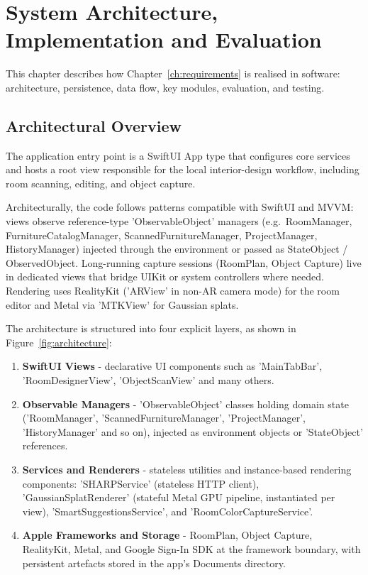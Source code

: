 \chapter{System Architecture, Implementation and Evaluation}
\label{ch:implementation}

This chapter describes how Chapter~\ref{ch:requirements} is realised in software: architecture, persistence, data flow, key modules, evaluation, and testing.

\section{Architectural Overview}

The application entry point is a SwiftUI App type that configures core services and hosts a root view responsible for the local interior-design workflow, including room scanning, editing, and object capture.

Architecturally, the code follows patterns compatible with SwiftUI and MVVM: views observe reference-type 'ObservableObject' managers (e.g.\ RoomManager, FurnitureCatalogManager, ScannedFurnitureManager, ProjectManager, HistoryManager) injected through the environment or passed as StateObject / ObservedObject. Long-running capture sessions (RoomPlan, Object Capture) live in dedicated views that bridge UIKit or system controllers where needed. Rendering uses RealityKit ('ARView' in non-AR camera mode) for the room editor and Metal via 'MTKView' for Gaussian splats.

The architecture is structured into four explicit layers, as shown in Figure~\ref{fig:architecture}:

\begin{enumerate}
    \item \textbf{SwiftUI Views} - declarative UI components such as 'MainTabBar', 'RoomDesignerView', 'ObjectScanView' and many others.
    \item \textbf{Observable Managers} - 'ObservableObject' classes holding domain state ('RoomManager', 'ScannedFurnitureManager', 'ProjectManager', 'HistoryManager' and so on), injected as environment objects or 'StateObject' references.
    \item \textbf{Services and Renderers} - stateless utilities and instance-based rendering components: 'SHARPService' (stateless HTTP client), 'GaussianSplatRenderer' (stateful Metal GPU pipeline, instantiated per view), 'SmartSuggestionsService', and 'RoomColorCaptureService'.
    \item \textbf{Apple Frameworks and Storage} - RoomPlan, Object Capture, RealityKit, Metal, and Google Sign-In SDK at the framework boundary, with persistent artefacts stored in the app's Documents directory.
\end{enumerate}


